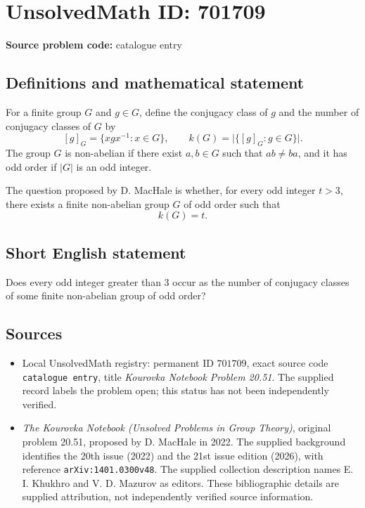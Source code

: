 \documentclass[11pt]{article}
\begin{document}
\section*{UnsolvedMath ID: 701709}
\textbf{Source problem code:} catalogue entry
\subsection{Definitions and mathematical statement}
For a finite group \(G\) and \(g\in G\), define the conjugacy class of \(g\) and the number of conjugacy classes of \(G\) by
\[
[g]_G=\{xgx^{-1}:x\in G\},\qquad k(G)=\bigl|\{[g]_G:g\in G\}\bigr|.
\]
The group \(G\) is non-abelian if there exist \(a,b\in G\) such that \(ab\ne ba\), and it has odd order if \(|G|\) is an odd integer.

The question proposed by D. MacHale is whether, for every odd integer \(t>3\), there exists a finite non-abelian group \(G\) of odd order such that
\[
k(G)=t.
\]
\subsection{Short English statement}
Does every odd integer greater than \(3\) occur as the number of conjugacy classes of some finite non-abelian group of odd order?
\subsection{Sources}
\begin{itemize}
\item Local UnsolvedMath registry: permanent ID \(701709\), exact source code \texttt{catalogue entry}, title \emph{Kourovka Notebook Problem 20.51}. The supplied record labels the problem open; this status has not been independently verified.
\item \emph{The Kourovka Notebook (Unsolved Problems in Group Theory)}, original problem 20.51, proposed by D. MacHale in 2022. The supplied background identifies the 20th issue (2022) and the 21st issue edition (2026), with reference \texttt{arXiv:1401.0300v48}. The supplied collection description names E. I. Khukhro and V. D. Mazurov as editors. These bibliographic details are supplied attribution, not independently verified source information.
\end{itemize}
\end{document}

